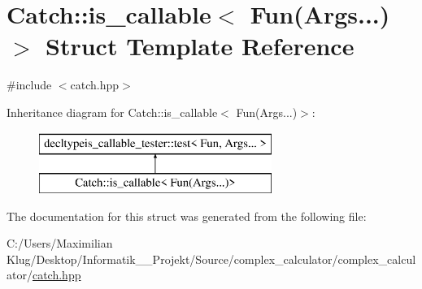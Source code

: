 \hypertarget{struct_catch_1_1is__callable_3_01_fun_07_args_8_8_8_08_4}{}\section{Catch\+:\+:is\+\_\+callable$<$ Fun(Args...)$>$ Struct Template Reference}
\label{struct_catch_1_1is__callable_3_01_fun_07_args_8_8_8_08_4}


{\ttfamily \#include $<$catch.\+hpp$>$}

Inheritance diagram for Catch\+:\+:is\+\_\+callable$<$ Fun(Args...)$>$\+:\begin{figure}[H]
\begin{center}
\leavevmode
\includegraphics[height=2.000000cm]{struct_catch_1_1is__callable_3_01_fun_07_args_8_8_8_08_4}
\end{center}
\end{figure}


The documentation for this struct was generated from the following file\+:\begin{DoxyCompactItemize}
\item 
C\+:/\+Users/\+Maximilian Klug/\+Desktop/\+Informatik\+\_\+\_\+\+Projekt/\+Source/complex\+\_\+calculator/complex\+\_\+calculator/\mbox{\hyperlink{catch_8hpp}{catch.\+hpp}}\end{DoxyCompactItemize}
